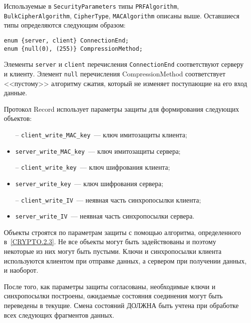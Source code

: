 Используемые в \lstinline{SecurityParameters} типы 
\lstinline{PRFAlgorithm}, \lstinline{BulkCipherAlgorithm}, 
\lstinline{CipherType}, \lstinline{MACAlgorithm} описаны выше. Оставшиеся 
типы определяются следующим образом: 
\begin{lstlisting}
enum {server, client} ConnectionEnd;
enum {null(0), (255)} CompressionMethod;
\end{lstlisting}

Элементы \lstinline{server} и \lstinline{client} перечисления 
\lstinline{ConnectionEnd} соответствуют серверу и клиенту. Элемент 
\lstinline{null} перечисления CompressionMethod соответствует <<пустому>> 
алгоритму сжатия, который не изменяет поступающие на его вход данные. 

Протокол Record использует параметры защиты для формирования следующих объектов:
\begin{itemize}
\item[--]
\lstinline{client_write_MAC_key}~--- ключ имитозащиты клиента;

\item[--]
\lstinline{server_write_MAC_key}~--- ключ имитозащиты сервера;

\item[--]
\lstinline{client_write_key}~--- ключ шифрования клиента;

\item[--]
\lstinline{server_write_key}~--- ключ шифрования сервера;

\item[--]
\lstinline{client_write_IV}~--- неявная часть синхропосылки клиента;

\item[--]
\lstinline{server_write_IV}~--- неявная часть синхропосылки сервера.
\end{itemize}
                                                            
Объекты строятся по параметрам защиты с помощью алгоритма, определенного 
в~\ref{CRYPTO.2.3}. Не все объекты могут быть задействованы и поэтому 
некоторые из них могут быть пустыми. Ключи и синхропосылки клиента 
используются клиентом при отправке данных, а сервером при получении 
данных, и наоборот.  

После того, как параметры защиты согласованы, необходимые ключи и 
синхропосылки построены, ожидаемые состояния соединения могут быть 
переведены в текущие. Смена состояний ДОЛЖНА быть учтена при обработке 
всех следующих фрагментов данных. 

